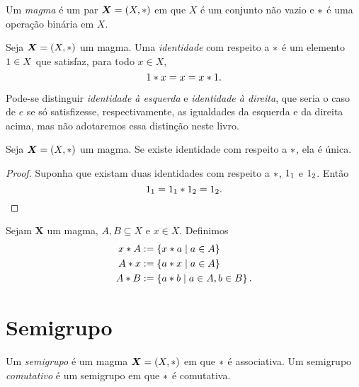 \begin{definition}
Um \emph{magma} é um par $\bm X=(X,\ast)$ em que $X$ é um conjunto não vazio e $ \ast $ é uma operação binária em $X$.
\end{definition}

\begin{definition}[Identidade]
Seja $\bm X=(X, \ast )$ um magma. Uma \emph{identidade} com respeito a $\ast$ é um elemento $1 \in X$ que satisfaz, para todo $x \in X$,
	\begin{equation*}
	1 \ast x = x = x \ast 1.
	\end{equation*}
\end{definition}

Pode-se distinguir \emph{identidade à esquerda} e \emph{identidade à direita}, que seria o caso de $e$ se só satisfizesse, respectivamente, as igualdades da esquerda e da direita acima, mas não adotaremos essa distinção neste livro.

\begin{proposition}
\label{prop:unic.elem.neut}
Seja $\bm X = (X, \ast )$ um magma. Se existe identidade com respeito a $\ast$, ela é única.
\end{proposition}
\begin{proof}
Suponha que existam duas identidades com respeito a $\ast$, $1_1$ e $1_2$. Então
	\begin{equation*}
	1_1 = 1_1 \ast 1_2 = 1_2. \qedhere
	\end{equation*}
\end{proof}

\begin{definition}
Sejam $\bm X$ um magma, $A,B \subseteq X$ e $x \in X$. Definimos
	\begin{align*}
	x \ast A &:= \left\{{x \ast a}\;\middle\vert\;{a \in A}\right\} \\
	A \ast x &:= \left\{{a\ast x}\;\middle\vert\;{a \in A}\right\} \\
	A \ast B &:= \left\{{a \ast b}\;\middle\vert\;{a \in A,b \in B}\right\}.
	\end{align*}
\end{definition}

\section{Semigrupo}

\begin{definition}
Um \emph{semigrupo} é um magma $\bm X=(X,\ast)$ em que $\ast$ é associativa. Um semigrupo \emph{comutativo} é um semigrupo em que $\ast$ é comutativa.
\end{definition}

